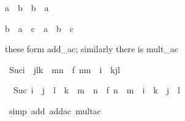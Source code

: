 \begin{isabellebody}
\begin{isamarkuptext}
\begin{isabelle}%
a\ {}\ b\ {}\ b\ {}\ a%
\end{isabelle}

\begin{isabelle}%
b\ {}\ {}a\ {}\ c{}\ {}\ a\ {}\ {}b\ {}\ c{}%
\end{isabelle}

these form add_ac; similarly there is mult_ac%
\end{isamarkuptext}%
\isamarkuptrue%
\isamarkupfalse%
\ {}Suc{}i\ {}\ j{}l{}k\ {}\ m{}n{}\ {}\ f\ {}n{}m\ {}\ i\ {}\ k{}j{}l{}{}%
\isadelimproof
%
\endisadelimproof
%
\isatagproof
%
\begin{isamarkuptxt}%
\begin{isabelle}%
\ {}{}\ Suc\ {}i\ {}\ j\ {}\ l\ {}\ k\ {}\ m\ {}\ n{}\ {}\ f\ {}n\ {}\ m\ {}\ i\ {}\ k\ {}\ j\ {}\ l{}%
\end{isabelle}%
\end{isamarkuptxt}%
\isamarkuptrue%
\isamarkupfalse%
\ {}simp\ add{}\ add{}ac\ mult{}ac{}%

\end{isabellebody}
